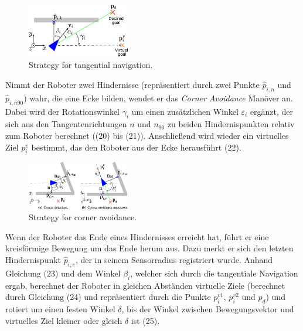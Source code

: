 \documentclass[conference]{IEEEtran}
\begin{document}
\begin{figure}[h]
    \centering
    \includegraphics[width=0.4\textwidth]{Pictures/Strategy for tangential navigation.png}
    \caption{Strategy for tangential navigation.}
    \label{fig:Strategy for tangential navigation}
\end{figure}

Nimmt der Roboter zwei Hindernisse (repräsentiert durch zwei Punkte \( \hat{p}_{i,n} \) und \( \hat{p}_{i,n90} \)) 
wahr, die eine Ecke bilden, wendet er das \textit{Corner Avoidance} Manöver an. 
Dabei wird der Rotationswinkel \( \gamma_i \) um einen zusätzlichen Winkel \( \varepsilon_i \) 
ergänzt, der sich aus den Tangentenrichtungen $n$ und $n_{90}$ zu beiden Hindernispunkten 
relativ zum Roboter berechnet ((20) bis (21)). Anschließend wird wieder
ein virtuelles Ziel $p_i^v$ bestimmt, das den Roboter aus der Ecke herausführt (22).

\begin{figure}[h]
    \centering
    \includegraphics[width=0.4\textwidth]{Pictures/Strategy for corner avoidance.png}
    \caption{Strategy for corner avoidance.}
    \label{fig:Strategy for corner avoidance}
\end{figure}

Wenn der Roboter das Ende eines Hindernisses erreicht hat, führt er eine 
kreisförmige Bewegung um das Ende herum aus. Dazu merkt er sich den letzten 
Hindernispunkt \( \hat{p}_{i,e} \), der in seinem Sensorradius registriert wurde. Anhand  
Gleichung (23) und dem Winkel \( \beta_{i} \), welcher sich durch die tangentiale Navigation 
ergab, berechnet der Roboter in gleichen Abständen virtuelle Ziele (berechnet 
durch Gleichung (24) und repräsentiert durch die Punkte \( p_i^{v1} \), \( p_i^{v2} \) und \( p_d \)) und rotiert um einen 
festen Winkel \( \delta \), bis der Winkel zwischen Bewegungsvektor und virtuelles Ziel kleiner oder gleich \( \delta \) ist (25).
\end{document}
